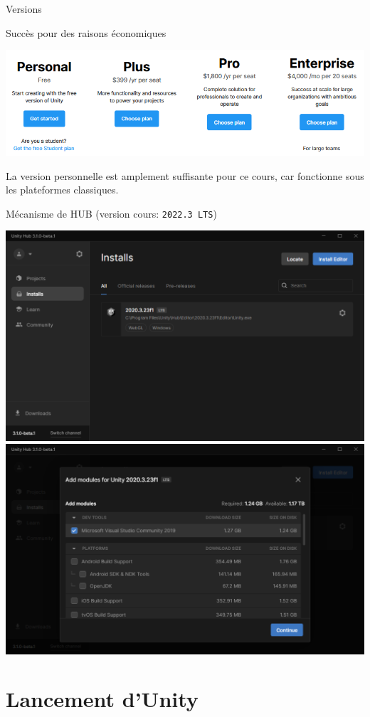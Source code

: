 \begin{frame}{Versions}
	\begin{block}{Succès pour des raisons économiques}
\begin{center}
	\includegraphics[width=0.5\linewidth]{../../imgs/licence_plan}
\end{center}

	La version personnelle est amplement suffisante pour ce cours, car fonctionne sous les plateformes classiques.
	\end{block}

	\begin{block}{Mécanisme de HUB (version cours: \texttt{2022.3 LTS})}
\begin{center}
\hfill
	\includegraphics[width=0.45\linewidth]{../../imgs/unity_hub}
\hfill
	\includegraphics[width=0.45\linewidth]{../../imgs/unity_hub_module}
\hfill
\end{center}

	\end{block}
\end{frame}

\section{Lancement d'Unity}

